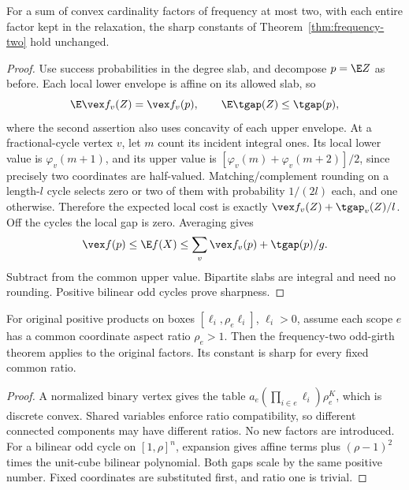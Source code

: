\begin{theorem}\label{thm:cardinality-frequency}
For a sum of convex cardinality factors of frequency at most two,
with each entire factor kept in the relaxation, the sharp constants of
Theorem~\ref{thm:frequency-two} hold unchanged.
\end{theorem}
\begin{proof}
Use success probabilities in the degree slab, and decompose $p=\E Z$
as before. Each local lower envelope is affine on its allowed slab, so
\[
 \E\vex f_v(Z)=\vex f_v(p),\qquad \E\tgap(Z)\le\tgap(p),
\]
where the second assertion also uses concavity of each upper envelope.
At a fractional-cycle vertex $v$, let $m$ count its incident integral
ones. Its local lower value is $\varphi_v(m+1)$, and its upper value
is $[\varphi_v(m)+\varphi_v(m+2)]/2$, since precisely two coordinates
are half-valued. Matching/complement rounding on a length-$l$ cycle
selects zero or two of them with probability $1/(2l)$ each, and one
otherwise. Therefore the expected local cost is exactly
$\vex f_v(Z)+\tgap_v(Z)/l$. Off the cycles the local gap is zero.
Averaging gives
\[
 \vex f(p)\le\E f(X)\le\sum_v\vex f_v(p)+\tgap(p)/g.
\]
Subtract from the common upper value. Bipartite slabs are integral and
need no rounding. Positive bilinear odd cycles prove sharpness.
\end{proof}

\begin{corollary}\label{cor:cardinality-box}
For original positive products on boxes $[\ell_i,\rho_e\ell_i]$,
$\ell_i>0$, assume each scope $e$ has a common coordinate aspect ratio
$\rho_e>1$. Then the frequency-two odd-girth theorem applies to the
original factors. Its constant is sharp for every fixed common ratio.
\end{corollary}
\begin{proof}
A normalized binary vertex gives the table
$a_e(\prod_{i\in e}\ell_i)\rho_e^K$, which is discrete convex.
Shared variables enforce ratio compatibility, so different connected
components may have different ratios. No new factors are introduced.
For a bilinear odd cycle on $[1,\rho]^n$, expansion gives affine terms
plus $(\rho-1)^2$ times the unit-cube bilinear polynomial. Both gaps
scale by the same positive number. Fixed coordinates are substituted
first, and ratio one is trivial.
\end{proof}

